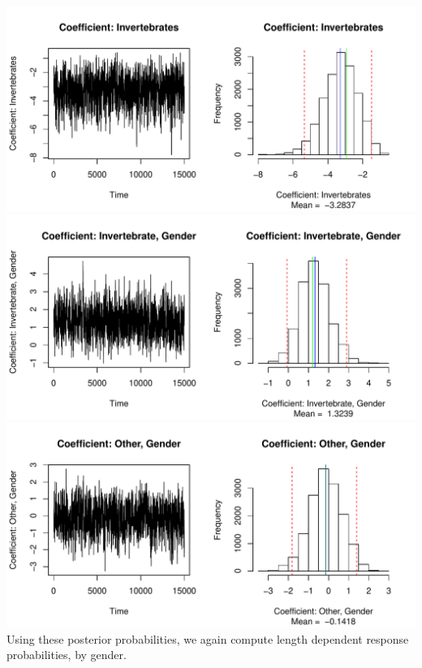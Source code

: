 \documentclass[12pt]{article}
\begin{document}
\begin{enumerate}
\begin{enumerate}[(a)]
	\includegraphics[scale = .7]{plot10.pdf} \\
	\includegraphics[scale = .7]{plot11.pdf} \\
	\includegraphics[scale = .7]{plot211.pdf} \\
	Using these posterior probabilities, we again compute length dependent  response probabilities, by gender. \\
	\newline

\end{enumerate}
\end{enumerate}
\end{document}
